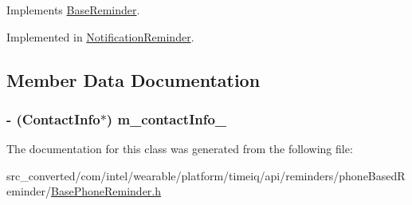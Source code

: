 Implements \hyperlink{interface_base_reminder_a70c1501567218c45cc3574a15af85773}{Base\+Reminder}.



Implemented in \hyperlink{interface_notification_reminder_a3b064f06818449a51bc0a1a556513377}{Notification\+Reminder}.



\subsection{Member Data Documentation}
\hypertarget{interface_base_phone_reminder_a4161d9c29f6d3d027c2e46dfa934ae64}{}
\subsubsection[{m\+\_\+contact\+Info\+\_\+}]{\setlength{\rightskip}{0pt plus 5cm}-\/ ({\bf Contact\+Info}$\ast$) m\+\_\+contact\+Info\+\_\+}\label{interface_base_phone_reminder_a4161d9c29f6d3d027c2e46dfa934ae64}


The documentation for this class was generated from the following file\+:\begin{DoxyCompactItemize}
\item 
src\+\_\+converted/com/intel/wearable/platform/timeiq/api/reminders/phone\+Based\+Reminder/\hyperlink{_base_phone_reminder_8h}{Base\+Phone\+Reminder.\+h}\end{DoxyCompactItemize}
